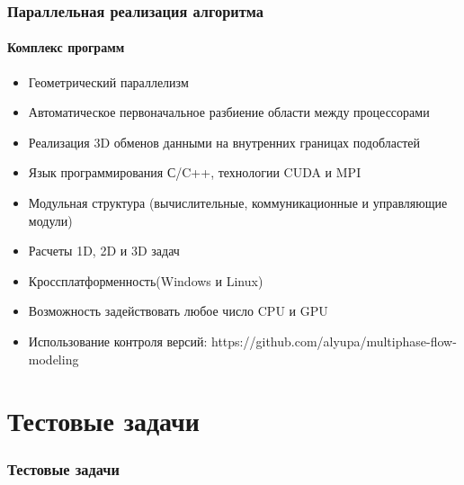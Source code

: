 \documentclass[10pt,pdf,hyperref={unicode}]{beamer} %
\begin{document}
\begin{frame}
\begin{center}
\frametitle{Параллельная реализация алгоритма}
\framesubtitle{Комплекс программ}
\begin{itemize}
\item Геометрический параллелизм
\item Автоматическое первоначальное разбиение области между процессорами
\item Реализация 3D обменов данными на внутренних границах подобластей
\item Язык программирования С/C++, технологии CUDA и MPI
\item Модульная структура (вычислительные, коммуникационные и управляющие модули)
\item Расчеты 1D, 2D и 3D задач
\item Кроссплатформенность(Windows и Linux)
\item Возможность задействовать любое число CPU и GPU
\item Использование контроля версий: https://github.com/alyupa/multiphase-flow-modeling
\end{itemize}
\end{center}
\end{frame}

\section{Тестовые задачи}

\begin{frame}
\begin{center}
\frametitle{Тестовые задачи}
\framesubtitle{\ }
\end{center}
\end{frame}
\end{document}
